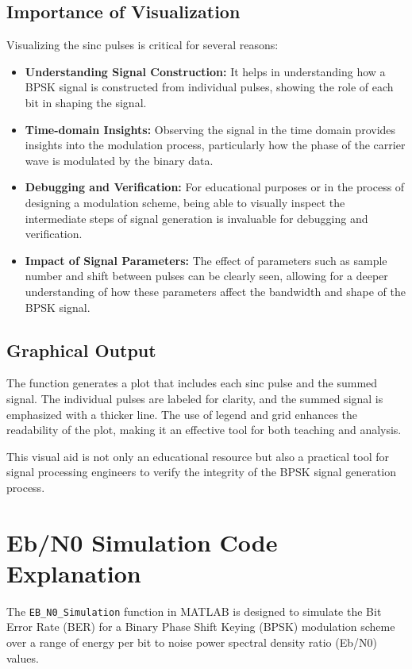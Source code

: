 \documentclass[11pt]{article}
\begin{document}
\subsection*{Importance of Visualization}
Visualizing the sinc pulses is critical for several reasons:

\begin{itemize}
    \item \textbf{Understanding Signal Construction:} It helps in understanding how a BPSK signal is constructed from individual pulses, showing the role of each bit in shaping the signal.
    \item \textbf{Time-domain Insights:} Observing the signal in the time domain provides insights into the modulation process, particularly how the phase of the carrier wave is modulated by the binary data.
    \item \textbf{Debugging and Verification:} For educational purposes or in the process of designing a modulation scheme, being able to visually inspect the intermediate steps of signal generation is invaluable for debugging and verification.
    \item \textbf{Impact of Signal Parameters:} The effect of parameters such as sample number and shift between pulses can be clearly seen, allowing for a deeper understanding of how these parameters affect the bandwidth and shape of the BPSK signal.
\end{itemize}

\subsection*{Graphical Output}
The function generates a plot that includes each sinc pulse and the summed signal. The individual pulses are labeled for clarity, and the summed signal is emphasized with a thicker line. The use of legend and grid enhances the readability of the plot, making it an effective tool for both teaching and analysis.

This visual aid is not only an educational resource but also a practical tool for signal processing engineers to verify the integrity of the BPSK signal generation process.


\section*{Eb/N0 Simulation Code Explanation}

The \texttt{EB\_N0\_Simulation} function in MATLAB is designed to simulate the Bit Error Rate (BER) for a Binary Phase Shift Keying (BPSK) modulation scheme over a range of energy per bit to noise power spectral density ratio (Eb/N0) values.
\end{document}
